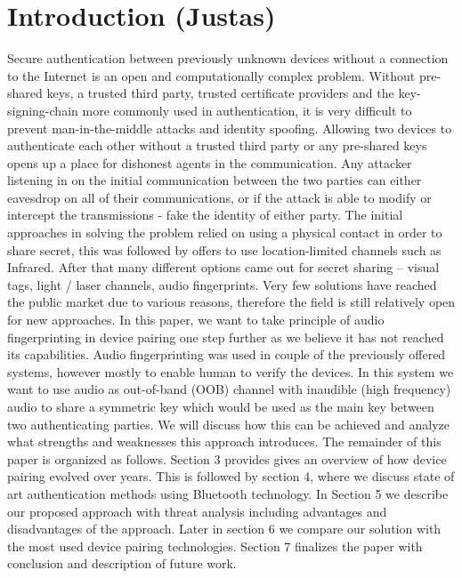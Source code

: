 \documentclass[12pt]{article}
\begin{document}
\section{Introduction (Justas)}
\label{sec:Introduction}
Secure authentication between previously unknown devices without a connection to the Internet is an open and computationally complex problem. Without pre-shared keys, a trusted third party, trusted certificate providers and the key-signing-chain more commonly used in authentication, it is very difficult to prevent man-in-the-middle attacks and identity spoofing.
\newline
Allowing two devices to authenticate each other without a trusted third party or any pre-shared keys opens up a place for dishonest agents in the communication. Any attacker listening in on the initial communication between the two parties can either eavesdrop on all of their communications, or if the attack is able to modify or intercept the transmissions - fake the identity of either party.
\newline
The initial approaches in solving the problem relied on using a physical contact in order to share secret, this was followed by offers to use location-limited channels such as Infrared. After that many different options came out for secret sharing – visual tags, light / laser channels, audio fingerprints. Very few solutions have reached the public market due to various reasons, therefore the field is still relatively open for new approaches.
\newline
In this paper, we want to take principle of audio fingerprinting in device pairing one step further as we believe it has not reached its capabilities. Audio fingerprinting was used in couple of the previously offered systems, however mostly to enable human to verify the devices. In this system we want to use audio as out-of-band (OOB) channel with inaudible (high frequency) audio to share a symmetric key which would be used as the main key between two authenticating parties. We will discuss how this can be achieved and analyze what strengths and weaknesses this approach introduces.
\newline
The remainder of this paper is organized as follows.
Section 3 provides gives an overview of how device pairing evolved over years. This is followed by section 4, where we discuss state of art authentication methods using Bluetooth technology. In Section 5 we describe our proposed approach with threat analysis including advantages and disadvantages of the approach. Later in section 6 we compare our solution with the most used device pairing technologies. Section 7 finalizes the paper with conclusion and description of future work.
\end{document}
